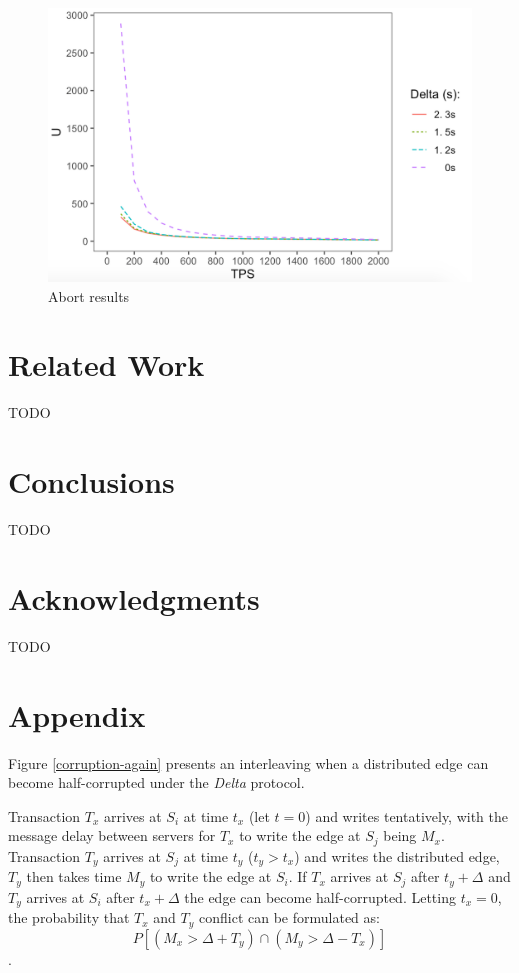 \documentclass[sigplan,10pt]{acmart}
\begin{document}
\begin{figure}[h]
  \centering
  \includegraphics[width=\linewidth]{./images/test}
  \caption{Abort results}
  \label{results2}
\end{figure}


\section{Related Work}

TODO

\section{Conclusions}

TODO

\section{Acknowledgments}

TODO


\appendix
\section{Appendix}

Figure \ref{corruption-again} presents an interleaving when a distributed edge can become half-corrupted under the \emph{Delta} protocol.

Transaction $T_x$ arrives at $S_i$ at time $t_x$ (let $t=0$) and writes tentatively, with the message delay between servers for $T_x$ to write the edge at $S_j$ being $M_x$. Transaction $T_y$ arrives at $S_j$ at time $t_y$ ($t_y > t_x$) and writes the distributed edge, $T_y$ then takes time $M_y$ to write the edge at $S_i$. If $T_x$ arrives at $S_j$ after $t_y + \Delta$ and $T_y$ arrives at $S_i$ after $t_x + \Delta$ the edge can become half-corrupted. Letting $t_x = 0 $, the probability that $T_x$ and $T_y$ conflict can be formulated as: $$ P \left[ ( M_x >  \Delta + T_y) \cap (M_y > \Delta - T_x) \right]$$.
\end{document}
